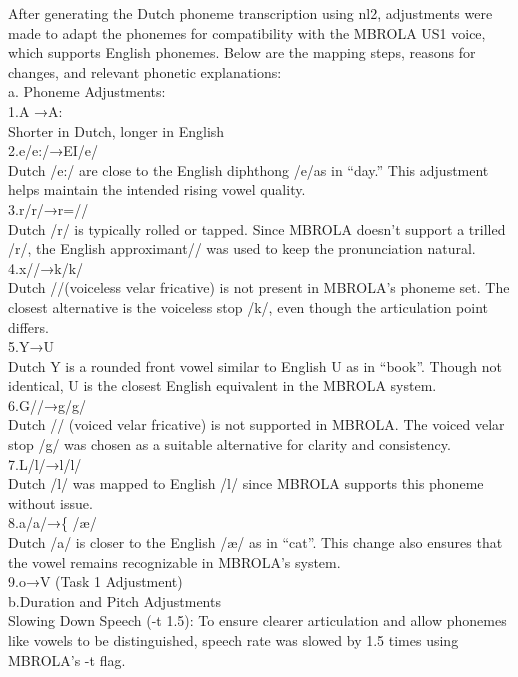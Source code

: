 \documentclass{../labbook}
\begin{document}
\begin{solution}
After generating the Dutch phoneme transcription using nl2, adjustments were made to adapt the phonemes for compatibility with the MBROLA US1 voice, which supports English phonemes. Below are the mapping steps, reasons for changes, and relevant phonetic explanations:\\
a. Phoneme Adjustments:\\
1.A →A: \\
Shorter in Dutch, longer in English\\
2.e/e:/→EI/e/\\
Dutch /e:/ are close to the English diphthong /e/as in “day.” This adjustment helps maintain the intended rising vowel quality.\\
3.r/r/→r=//\\
 Dutch /r/ is typically rolled or tapped. Since MBROLA doesn’t support a trilled /r/, the English approximant// was used to keep the pronunciation natural.\\
4.x//→k/k/\\
Dutch //(voiceless velar fricative) is not present in MBROLA's phoneme set. The closest alternative is the voiceless stop /k/, even though the articulation point differs.\\
5.Y→U\\
Dutch Y is a rounded front vowel similar to English U as in “book”. Though not identical, U is the closest English equivalent in the MBROLA system.\\
6.G//→g/g/\\
Dutch // (voiced velar fricative) is not supported in MBROLA. The voiced velar stop /g/ was chosen as a suitable alternative for clarity and consistency.\\
7.L/l/→l/l/\\
Dutch /l/ was mapped to English /l/ since MBROLA supports this phoneme without issue.\\
8.a/a/→\{ /æ/\\
Dutch /a/ is closer to the English /æ/ as in “cat”. This change also ensures that the vowel remains recognizable in MBROLA’s system.\\
9.o→V (Task 1 Adjustment)\\
 b.Duration and Pitch Adjustments\\
    Slowing Down Speech (-t 1.5): To ensure clearer articulation and allow phonemes like vowels to be distinguished, speech rate was slowed by 1.5 times using MBROLA’s -t flag.



\end{solution}
\end{document}
